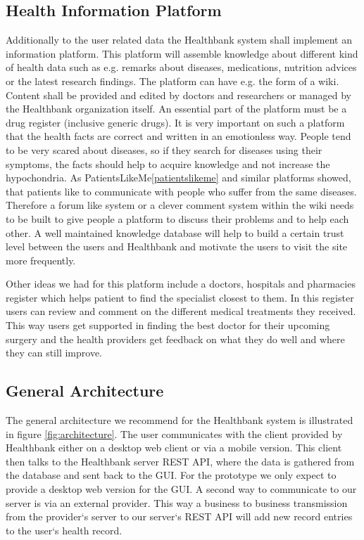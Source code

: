 \subsection{Health Information Platform}\label{HIP}

Additionally to the user related data the Healthbank system shall implement an information platform. This platform will assemble knowledge about different kind of health data such as e.g. remarks about diseases, medications, nutrition advices or the latest research findings. The platform can have e.g. the form of a wiki. Content shall be provided and edited by doctors and researchers or managed by the Healthbank organization itself. An essential part of the platform must be a drug register (inclusive generic drugs). It is very important on such a platform that the health facts are correct and written in an emotionless way. People tend to be very scared about diseases, so if they search for diseases using their symptoms, the facts should help to acquire knowledge and not increase the hypochondria. As PatientsLikeMe\ref{patientslikeme} and similar platforms showed, that patients like to communicate with people who suffer from the same diseases. Therefore a forum like system or a clever comment system within the wiki needs to be built to give people a platform to discuss their problems and to help each other. A well maintained knowledge database will help to build a certain trust level between the users and Healthbank and motivate the users to visit the site more frequently.
 
Other ideas we had for this platform include a doctors, hospitals and pharmacies register which helps patient to find the specialist closest to them. In this register users can review and comment on the different medical treatments they received. This way users get supported in finding the best doctor for their upcoming surgery and the health providers get feedback on what they do well and where they can still improve.


\subsection{General Architecture}

The general architecture we recommend for the Healthbank system is illustrated in figure \ref{fig:architecture}. The user communicates with the client provided by Healthbank either on a desktop web client or via a mobile version. This client then talks to the Healthbank server REST API, where the data is gathered from the database and sent back to the GUI. For the prototype we only expect to provide a desktop web version for the GUI. A second way to communicate to our server is via an external provider. This way a business to business transmission from the provider`s server to our server`s REST API will add new record entries to the user`s health record. 

